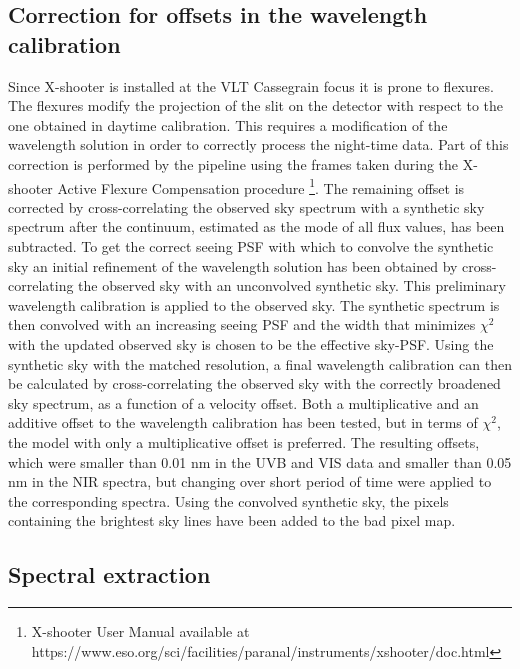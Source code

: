 \documentclass{aa}    %
\begin{document}
\subsection{Correction for offsets in the wavelength calibration}    \label{wavecal}

Since X-shooter is installed at the VLT Cassegrain focus it is prone to
flexures. The flexures modify the projection of the slit on the detector with
respect to the one obtained in daytime calibration. This requires a modification
of the wavelength solution in order to correctly process the night-time data.
Part of this correction is performed by the pipeline using the frames taken
during the X-shooter Active Flexure Compensation procedure \footnote{X-shooter
	User Manual available at
	https://www.eso.org/sci/facilities/paranal/instruments/xshooter/doc.html}. The
remaining offset is corrected by cross-correlating the observed sky spectrum
with a synthetic sky spectrum \citep{Noll2012, Jones2013} after the continuum,
estimated as the mode of all flux values, has been subtracted. To get the
correct seeing PSF with which to convolve the synthetic sky an initial
refinement of the wavelength solution has been obtained by cross-correlating
the observed sky with an unconvolved synthetic sky. This preliminary wavelength
calibration is applied to the observed sky. The synthetic spectrum is then
convolved with an increasing seeing PSF and the width that minimizes $\chi^2$
with the updated observed sky is chosen to be the effective sky-PSF. Using the
synthetic sky with the matched resolution, a final wavelength calibration can
then be calculated by cross-correlating the observed sky with the correctly
broadened sky spectrum, as a function of a velocity offset. Both a
multiplicative and an additive offset to the wavelength calibration has been
tested, but in terms of $\chi^2$, the model with only a multiplicative offset is
preferred. The resulting offsets, which were smaller than 0.01 nm in the UVB and
VIS data and smaller than 0.05 nm in the NIR spectra, but changing over short
period of time were applied to the corresponding spectra. Using the convolved
synthetic sky, the pixels containing the brightest sky lines have been added to
the bad pixel map.

\subsection{Spectral extraction}    \label{extract}
\end{document}
